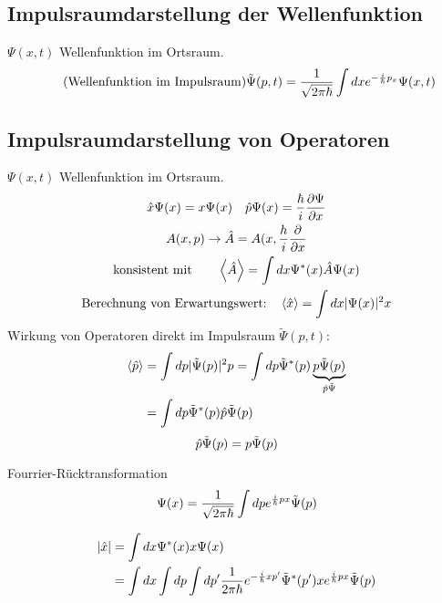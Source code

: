 \subsection{Impulsraumdarstellung der Wellenfunktion} %
\label{sub:Impulsraumdarstellung_der_Wellenfunktion}
$\Psi(x,t)$ Wellenfunktion im Ortsraum.
\begin{equation*}
    \tag*{\text{(Wellenfunktion im Impulsraum)}}
    \tilde{\Psi}(p,t) =
    \frac{1}{\sqrt{2 \pi \hbar}} \int dx e^{- \frac{i}{\hbar}p_x} \Psi(x,t)
\end{equation*}
\subsection{Impulsraumdarstellung von Operatoren} %
\label{sub:Impulsraumdarstellung_von_Operatoren}
$\Psi(x,t)$ Wellenfunktion im Ortsraum.
\begin{gather*}
    \hat{x}\Psi(x) = x \Psi(x) \quad \hat{p}\Psi(x) = \frac{\hbar}{i}\frac{\partial\Psi}{\partial
    x} \\
    A(x,p) \rightarrow \hat{A} = A(x,\frac{h}{i} \frac{\partial}{\partial x} \\
    \text{konsistent mit} \qquad \left\langle \hat{A}  \right\rangle =
    \int dx \Psi^*(x) \hat{A} \Psi(x) \\
    \text{Berechnung von Erwartungswert:} \quad \left\langle \hat{x}
    \right\rangle = \int dx \lvert \Psi(x) \rvert^2 x
\end{gather*}
Wirkung von Operatoren direkt im Impulsraum $\tilde{\Psi}(p,t)$:
\begin{align*}
    \left\langle \hat{p} \right\rangle 
    &=
    \int dp \lvert \tilde{\Psi}(p) \rvert^2 p = \int dp \tilde{\Psi}^*(p)
    \underbrace{p \tilde{\Psi}(p)}_{\hat{p}\tilde{\Psi}} \\
    &=
    \int dp \tilde{\Psi}^* (p) \hat{p} \tilde{\Psi}(p)
\end{align*}
\begin{equation*}
    \hat{p}\tilde{\Psi}(p) = p \tilde{\Psi}(p)
\end{equation*}
\begin{eins}{Fourrier-Rücktransformation}
    \begin{equation*}
        \Psi(x) = \frac{1}{\sqrt{2 \pi \hbar}} \int dp e^{\frac{i}{\hbar}px}
        \tilde{\Psi}(p)
    \end{equation*}
\end{eins}
\begin{align*}
    \lvert \hat{x} \rvert 
    &=
    \int dx \Psi^*(x) x \Psi(x) \\
    &=
    \int dx \int dp \int dp' \frac{1}{2 \pi \hbar} e^{-  \frac{i}{\hbar} xp'}
    \tilde{\Psi}^*(p') x e^{\frac{i}{\hbar} px} \tilde{\Psi}(p)
\end{align*}
